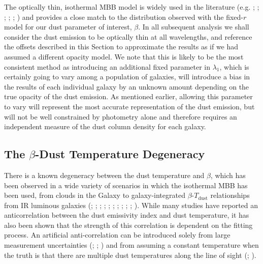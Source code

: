 The optically thin, isothermal MBB model is widely used in the literature (e.g. \citealt{Magdis_2012}; \citealt{Simpson_2017}; \citealt{Lamperti_2019}; \citealt{Dudzeviciute_2020}; \citealt{Valentino_2020}; \citealt{daCunha_2021}) and provides a close match to the distribution observed with the fixed-$r$ model for our dust parameter of interest, $\beta$. In all subsequent analysis we shall consider the dust emission to be optically thin at all wavelengths, and reference the offsets described in this Section to approximate the results as if we had assumed a different opacity model. We note that this is likely to be the most consistent method as introducing an additional fixed parameter in $\lambda_1$, which is certainly going to vary among a population of galaxies, will introduce a bias in the results of each individual galaxy by an unknown amount depending on the true opacity of the dust emission. As mentioned earlier, allowing this parameter to vary will represent the most accurate representation of the dust emission, but will not be well constrained by photometry alone and therefore requires an independent measure of the dust column density for each galaxy.

\subsection{The $\beta$-Dust Temperature Degeneracy}

There is a known degeneracy between the dust temperature and $\beta$, which has been observed in a wide variety of scenarios in which the isothermal MBB has been used, from clouds in the Galaxy to galaxy-integrated $\beta$-$T_{\textrm{dust}}$ relationships from IR luminous galaxies (\citealt{Dupac_2003}; \citealt{Desert_2008}; \citealt{Paradis_2010}; \citealt{Schnee_2010}; \citealt{Veneziani_2010}; \citealt{Bracco_2011}; \citealt{Galametz_2012}; \citealt{Paladini_2012}; \citealt{Smith_2012}; \citealt{Lamperti_2019}; \citealt{daCunha_2021}).  While many studies have reported an anticorrelation between the dust emissivity index and dust temperature, it has also been shown that the strength of this correlation is dependent on the fitting process. An artificial anti-correlation can be introduced solely from large measurement uncertainties (\citealt{Shetty_2009a}; \citealt{Kelly_2012}; \citealt{Juvela_2012a}) and from assuming a constant temperature when the truth is that there are multiple dust temperatures along the line of sight (\citealt{Shetty_2009b}; \citealt{Juvela_2012b}).


